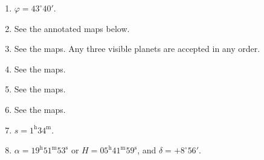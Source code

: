 \begin{enumerate}
\item $\varphi=43^\circ40'$.
\item See the annotated maps below.
\item See the maps. Any three visible planets are accepted in any order.
\item See the maps.
\item See the maps.
\item See the maps.
\item $s=1^{\mathrm h}34^{\mathrm m}$.
\item $\alpha=19^{\mathrm h}51^{\mathrm m}53^{\mathrm s}$ or
  $H=05^{\mathrm h}41^{\mathrm m}59^{\mathrm s}$,
  and $\delta=+8^\circ56'$.
\end{enumerate}
